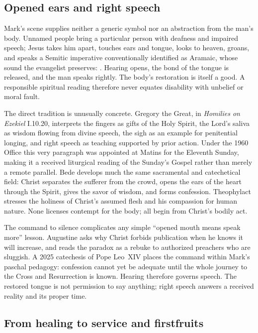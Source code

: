 \newpage

\subsection*{Opened ears and right speech}

Mark's scene supplies neither a generic symbol nor an abstraction from the
man's body. Unnamed people bring a particular person with deafness and impaired
speech; Jesus takes him apart, touches ears and tongue, looks to heaven,
groans, and speaks a Semitic imperative conventionally identified as Aramaic,
whose sound the evangelist preserves: . Hearing opens, the bond of the tongue is released, and the
man speaks rightly. The body's restoration is itself a good. A responsible
spiritual reading therefore never equates disability with unbelief or moral
fault.

The direct tradition is unusually concrete. Gregory the Great, in
\emph{Homilies on Ezekiel} I.10.20, interprets the fingers as gifts of the
Holy Spirit, the Lord's saliva as wisdom flowing from divine speech, the sigh
as an example for penitential longing, and right speech as teaching supported
by prior action. Under the 1960 Office this very paragraph was appointed at
Matins for the Eleventh Sunday, making it a received liturgical reading of the
Sunday's Gospel rather than merely a remote parallel. Bede develops much the
same sacramental and catechetical field: Christ separates the sufferer from
the crowd, opens the ears of the heart through the Spirit, gives the savor of
wisdom, and forms confession. Theophylact stresses the holiness of Christ's
assumed flesh and his compassion for human nature. None licenses contempt for
the body; all begin from Christ's bodily act.

The command to silence complicates any simple ``opened mouth means speak
more'' lesson. Augustine asks why Christ forbids publication when he knows it
will increase, and reads the paradox as a rebuke to authorized preachers who
are sluggish. A 2025 catechesis of Pope Leo~XIV places the command within
Mark's paschal pedagogy: confession cannot yet be adequate until the whole
journey to the Cross and Resurrection is known. Hearing therefore governs
speech. The restored tongue is not permission to say anything; right speech
answers a received reality and its proper time.

\subsection*{From healing to service and firstfruits}

